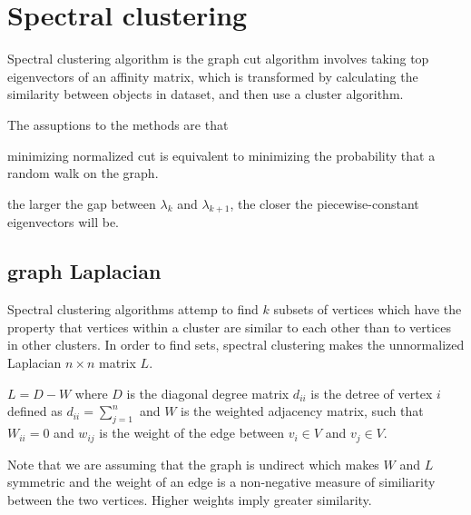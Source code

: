\section{Spectral clustering}
Spectral clustering algorithm is the graph cut algorithm involves taking top eigenvectors of an affinity matrix, which is transformed by calculating the similarity between objects in dataset, and then use a cluster algorithm.

The assuptions to the methods are that \begin{inparaenum}
\item minimizing normalized cut is equivalent to minimizing the probability that a random walk on the graph.
\item the larger the gap between $\lambda_{k}$ and $\lambda_{k+1}$, the closer the piecewise-constant eigenvectors will be.
\end{inparaenum}

\subsection{graph Laplacian}
Spectral clustering algorithms attemp to find $k$ subsets of vertices which have the property that vertices within a cluster are similar to each other than to vertices in other clusters. In order to find sets, spectral clustering makes the unnormalized Laplacian $n \times n$ matrix $L$.

$L = D - W$ where $D$ is the diagonal degree matrix $d_{ii}$ is the detree of vertex $i$ defined as $d_{ii} = \sum_{j=1}^n$ and $W$ is the weighted adjacency matrix, such that $W_{ii} = 0$ and $w_{ij}$ is the weight of the edge between $v_i \in V$ and $v_j \in V$.

Note that we are assuming that the graph is undirect which makes $W$ and $L$ symmetric and the weight of an edge is a non-negative measure of similiarity between the two vertices. 
Higher weights imply greater similarity. 

